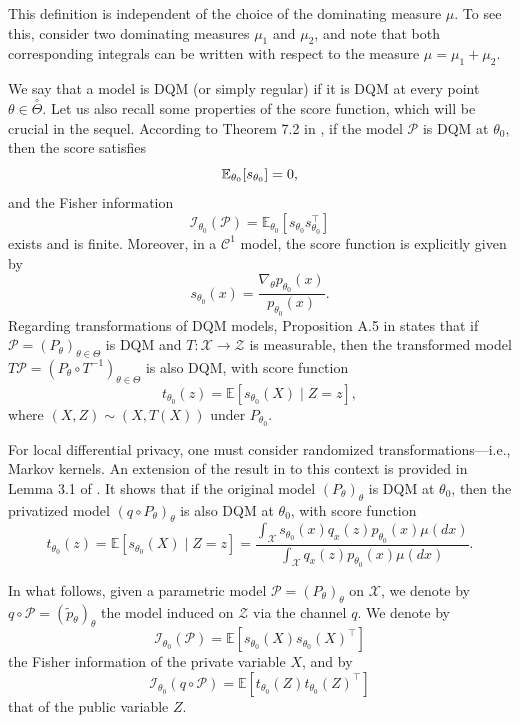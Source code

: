 \documentclass[a4paper, 11pt]{article}
\theoremstyle{definition}
\newcommand{\cX}{{\mathcal{X}}}
\begin{document}
{This definition is independent of the choice of the dominating measure $\mu$. To see this, consider two dominating measures $\mu_1$ and $\mu_2$, and note that both corresponding integrals can be written with respect to the measure $\mu = \mu_1 + \mu_2$.

We say that a model is DQM (or simply regular) if it is DQM at every point $\theta \in \overset{\circ}{\Theta}$. Let us also recall some properties of the score function, which will be crucial in the sequel. According to Theorem 7.2 in \cite{Van07}, if the model $\mathcal{P}$ is DQM at $\theta_0$, then the score satisfies 
\begin{equation}{\label{eq: score centered}}
\mathbb{E}_{\theta_0}[s_{\theta_0}] = 0,
\end{equation}
and the Fisher information
$$
\mathcal{I}_{\theta_0}(\mathcal{P}) = \mathbb{E}_{\theta_0}[s_{\theta_0} s_{\theta_0}^{\top}]
$$
exists and is finite. Moreover, in a $\mathcal{C}^1$ model, the score function is explicitly given by
$$
s_{\theta_0}(x) = \frac{\nabla_\theta p_{\theta_0}(x)}{p_{\theta_0}(x)}.
$$
Regarding transformations of DQM models, Proposition A.5 in \cite{Bic93} states that if $\mathcal{P} = (P_\theta)_{\theta \in \Theta}$ is DQM and $T: \mathcal{X} \to \mathcal{Z}$ is measurable, then the transformed model $T\mathcal{P} = (P_\theta \circ T^{-1})_{\theta \in \Theta}$ is also DQM, with score function
$$
t_{\theta_0}(z) = \mathbb{E}[s_{\theta_0}(X) \mid Z = z],
$$
where $(X, Z) \sim (X, T(X))$ under $P_{\theta_0}$.

For local differential privacy, one must consider randomized transformations—i.e., Markov kernels. An extension of the result in \cite{Bic93} to this context is provided in Lemma 3.1 of \cite{steinbergerEfficiencyLocalDifferent}. It shows that if the original model $(P_\theta)_\theta$ is DQM at $\theta_0$, then the privatized model $(q \circ P_\theta)_\theta$ is also DQM at $\theta_0$, with score function
\begin{equation} \label{eq : score public}
t_{\theta_0}(z) = \mathbb{E}\left[s_{\theta_0}(X) \mid Z = z\right] =
\frac{\int_\cX s_{\theta_0}(x) q_x(z) p_{\theta_0}(x) \mu(dx)}{\int_\cX q_x(z) p_{\theta_0}(x) \mu(dx)}.
\end{equation}

In what follows, given a parametric model $\mathcal{P} = (P_\theta)_\theta$ on $\mathcal{X}$, we denote by $q \circ \mathcal{P} = (\tilde{p}_\theta)_\theta$ the model induced on $\mathcal{Z}$ via the channel $q$. We denote by
$$
\mathcal{I}_{\theta_0}(\mathcal{P}) = \mathbb{E}\left[s_{\theta_0}(X)s_{\theta_0}(X)^{\top}\right]
$$
the Fisher information of the private variable $X$, and by
$$
\mathcal{I}_{\theta_0}(q \circ \mathcal{P}) = \mathbb{E}\left[t_{\theta_0}(Z)t_{\theta_0}(Z)^{\top}\right]
$$
that of the public variable $Z$.

}
\end{document}
